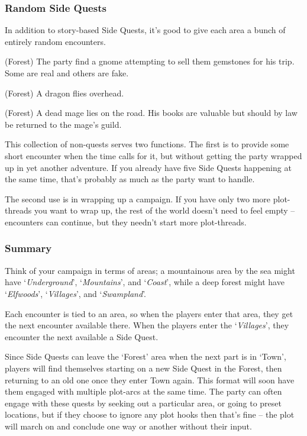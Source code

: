 \begin{multicols}{2}
\subsubsection{Random Side Quests}

In addition to story-based Side Quests, it's good to give each area a bunch of entirely random encounters.

\begin{list}{\Square}{}

	\item{(Forest) The party find a gnome attempting to sell them gemstones for his trip. Some are real and others are fake.}

	\item{(Forest) A dragon flies overhead.}

	\item{(Forest) A dead mage lies on the road. His books are valuable but should by law be returned to the mage's guild.}

\end{list}

This collection of non-quests serves two functions.
The first is to provide some short encounter when the time calls for it, but without getting the party wrapped up in yet another adventure.
If you already have five Side Quests happening at the same time, that's probably as much as the party want to handle.

The second use is in wrapping up a campaign.
If you have only two more plot-threads you want to wrap up, the rest of the world doesn't need to feel empty -- encounters can continue, but they needn't start more plot-threads.

\subsubsection{Summary}

Think of your campaign in terms of areas; a mountainous area by the sea might have `\emph{Underground}', `\emph{Mountains}', and `\emph{Coast}', while a deep forest might have `\emph{Elfwoods}', `\emph{Villages}', and `\emph{Swampland}'.

Each encounter is tied to an area, so when the players enter that area, they get the next encounter available there.
When the players enter the `\emph{Villages}', they encounter the next available a Side Quest.

Since Side Quests can leave the `Forest' area when the next part is in `Town', players will find themselves starting on a new Side Quest in the Forest, then returning to an old one once they enter Town again.
This format will soon have them engaged with multiple plot-arcs at the same time.
The party can often engage with these quests by seeking out a particular area, or going to preset locations, but if they choose to ignore any plot hooks then that's fine -- the plot will march on and conclude one way or another without their input.


\end{multicols}
